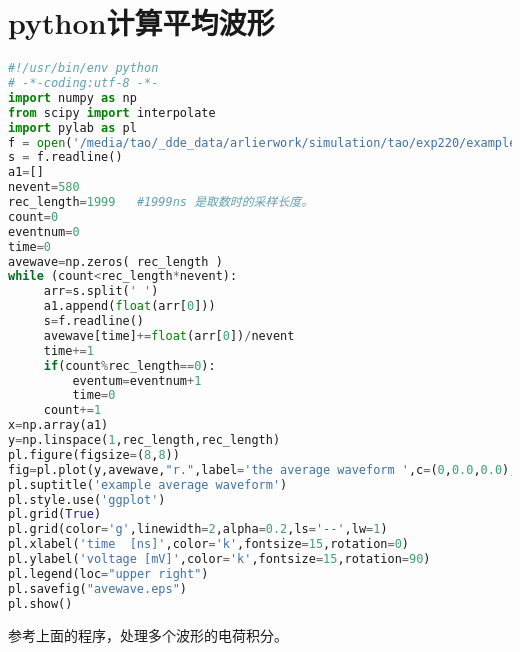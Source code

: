 \documentclass{elegantbook}
\begin{document}
\section{python计算平均波形}
\begin{lstlisting}[label={lst:simple},language=python]
#!/usr/bin/env python
# -*-coding:utf-8 -*-
import numpy as np
from scipy import interpolate
import pylab as pl
f = open('/media/tao/_dde_data/arlierwork/simulation/tao/exp220/example.lvm')#换成你自己的文件名
s = f.readline()
a1=[]
nevent=580
rec_length=1999   #1999ns 是取数时的采样长度。
count=0
eventnum=0
time=0
avewave=np.zeros( rec_length )
while (count<rec_length*nevent):
     arr=s.split(' ')
     a1.append(float(arr[0]))
     s=f.readline()
     avewave[time]+=float(arr[0])/nevent
     time+=1
     if(count%rec_length==0):
         eventum=eventnum+1
         time=0
     count+=1
x=np.array(a1)
y=np.linspace(1,rec_length,rec_length)
pl.figure(figsize=(8,8))
fig=pl.plot(y,avewave,"r.",label='the average waveform ',c=(0,0.0,0.0),alpha=0.5,linestyle='-')
pl.suptitle('example average waveform')
pl.style.use('ggplot')
pl.grid(True)
pl.grid(color='g',linewidth=2,alpha=0.2,ls='--',lw=1)
pl.xlabel('time  [ns]',color='k',fontsize=15,rotation=0)
pl.ylabel('voltage [mV]',color='k',fontsize=15,rotation=90)
pl.legend(loc="upper right")
pl.savefig("avewave.eps")
pl.show()
\end{lstlisting}

参考上面的程序，处理多个波形的电荷积分。
\end{document}
